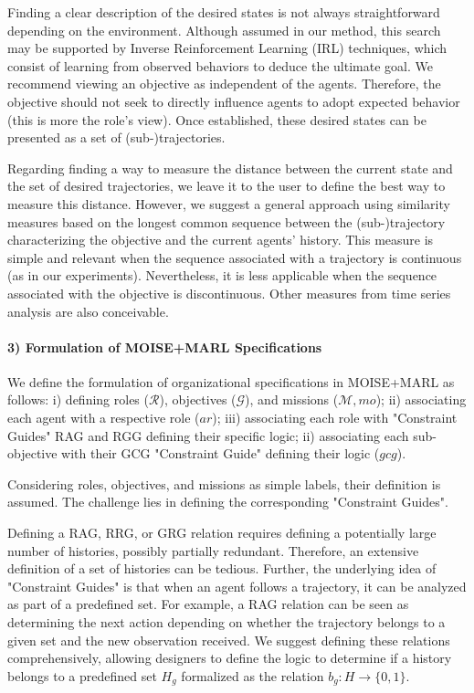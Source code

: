 \documentclass[sigconf,anonymous]{aamas}
\begin{document}
Finding a clear description of the desired states is not always straightforward depending on the environment. Although assumed in our method, this search may be supported by Inverse Reinforcement Learning (IRL) techniques, which consist of learning from observed behaviors to deduce the ultimate goal. We recommend viewing an objective as independent of the agents. Therefore, the objective should not seek to directly influence agents to adopt expected behavior (this is more the role's view). Once established, these desired states can be presented as a set of (sub-)trajectories.

Regarding finding a way to measure the distance between the current state and the set of desired trajectories, we leave it to the user to define the best way to measure this distance. However, we suggest a general approach using similarity measures based on the longest common sequence between the (sub-)trajectory characterizing the objective and the current agents' history. This measure is simple and relevant when the sequence associated with a trajectory is continuous (as in our experiments). Nevertheless, it is less applicable when the sequence associated with the objective is discontinuous. Other measures from time series analysis are also conceivable.

\paragraph{\textbf{3) Formulation of MOISE+MARL Specifications}} \quad

\noindent We define the formulation of organizational specifications in MOISE+MARL as follows: \quad i) defining roles ($\mathcal{R}$), objectives ($\mathcal{G}$), and missions ($\mathcal{M}, mo$); ii) associating each agent with a respective role ($ar$); \quad iii) associating each role with "Constraint Guides" RAG and RGG defining their specific logic; ii) associating each sub-objective with their GCG "Constraint Guide" defining their logic ($gcg$).

Considering roles, objectives, and missions as simple labels, their definition is assumed. The challenge lies in defining the corresponding "Constraint Guides".

Defining a RAG, RRG, or GRG relation requires defining a potentially large number of histories, possibly partially redundant. Therefore, an extensive definition of a set of histories can be tedious. Further, the underlying idea of "Constraint Guides" is that when an agent follows a trajectory, it can be analyzed as part of a predefined set. For example, a RAG relation can be seen as determining the next action depending on whether the trajectory belongs to a given set and the new observation received. We suggest defining these relations comprehensively, allowing designers to define the logic to determine if a history belongs to a predefined set $H_g$ formalized as the relation $b_g: H \to \{0,1\}$.
\end{document}
